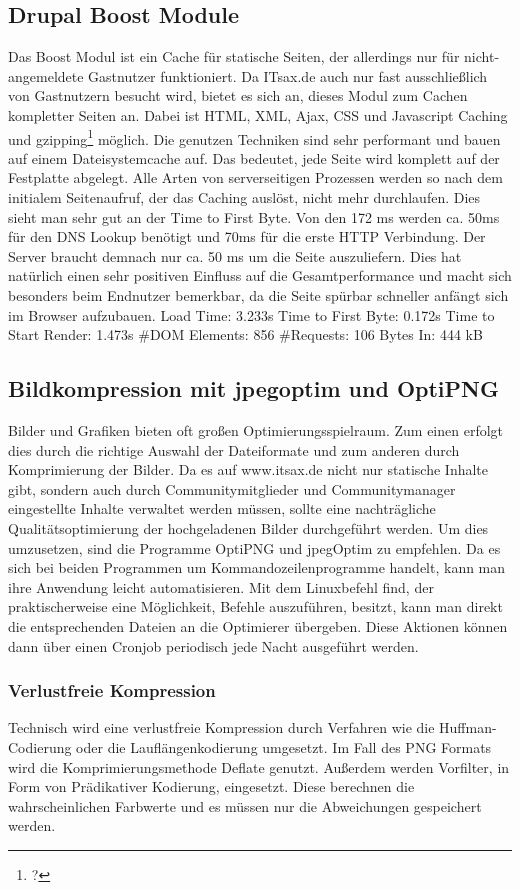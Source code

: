 \subsection{Drupal Boost Module} Das Boost Modul ist ein Cache für statische Seiten, der allerdings nur für nicht-angemeldete Gastnutzer funktioniert. Da ITsax.de auch nur fast ausschließlich von Gastnutzern besucht wird, bietet es sich an, dieses Modul zum Cachen kompletter Seiten an. Dabei ist HTML, XML, Ajax, CSS und Javascript Caching und gzipping\footnote{?} möglich. Die genutzen Techniken sind sehr performant und bauen auf einem Dateisystemcache auf. Das bedeutet, jede Seite wird komplett auf der Festplatte abgelegt. Alle Arten von serverseitigen Prozessen werden so nach dem initialem Seitenaufruf, der das Caching auslöst, nicht mehr durchlaufen. Dies sieht man sehr gut an der Time to First Byte. Von den 172 ms werden ca. 50ms für den DNS Lookup benötigt und 70ms für die erste HTTP Verbindung. Der Server braucht demnach nur ca. 50 ms um die Seite auszuliefern. Dies hat natürlich einen sehr positiven Einfluss auf die Gesamtperformance und macht sich besonders beim Endnutzer bemerkbar, da die Seite spürbar schneller anfängt sich im Browser aufzubauen. 
Load Time: 3.233s
Time to First Byte: 0.172s %
Time to Start Render: 1.473s
\#DOM Elements: 856 	
\#Requests: 106 %
Bytes In: 444 kB

\subsection{Bildkompression mit jpegoptim und OptiPNG}
Bilder und Grafiken bieten oft großen Optimierungsspielraum. Zum einen erfolgt dies durch die richtige Auswahl der Dateiformate und zum anderen durch Komprimierung der Bilder. Da es auf www.itsax.de nicht nur statische Inhalte gibt, sondern auch durch Communitymitglieder und Communitymanager eingestellte Inhalte verwaltet werden müssen, sollte eine nachträgliche Qualitätsoptimierung der hochgeladenen Bilder durchgeführt werden. Um dies umzusetzen, sind die Programme OptiPNG und jpegOptim zu empfehlen. Da es sich bei beiden Programmen um Kommandozeilenprogramme handelt, kann man ihre Anwendung leicht automatisieren. Mit dem Linuxbefehl find, der praktischerweise eine Möglichkeit, Befehle auszuführen, besitzt, kann man direkt die entsprechenden Dateien an die Optimierer übergeben. Diese Aktionen können dann über einen Cronjob periodisch jede Nacht ausgeführt werden. 

\subsubsection{Verlustfreie Kompression} Technisch wird eine verlustfreie Kompression durch Verfahren wie die Huffman-Codierung oder die Lauflängenkodierung umgesetzt. Im Fall des PNG Formats wird die Komprimierungsmethode Deflate genutzt. Außerdem werden Vorfilter, in Form von Prädikativer Kodierung, eingesetzt. Diese berechnen die wahrscheinlichen Farbwerte und es müssen nur die Abweichungen gespeichert werden. 

